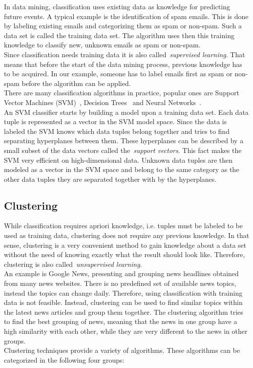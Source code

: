 In data mining, classification uses existing data as knowledge for predicting future events. A typical example is the identification of spam emails. This is done by labeling existing emails and categorizing them as spam or non-spam. Such a data set is called the training data set. The algorithm uses then this training knowledge to classify new, unknown emails as spam or non-spam.
\\
Since classification needs training data it is also called~\emph{supervised learning}. That means that before the start of the data mining process, previous knowledge has to be acquired. In our example, someone has to label emails first as spam or non-spam before the algorithm can be applied. 
\\
There are many classification algorithms in practice, popular ones are Support Vector Machines (SVM)~\parencite{svm}, Decision Trees~\parencite{descisiontree} and Neural Networks~\parencite{neuralnetwork}.
\\
An SVM classifier starts by building a model upon a training data set. Each data tuple is represented as a vector in the SVM model space. Since the data is labeled the SVM knows which data tuples belong together and tries to find separating hyperplanes between them. These hyperplanes can be described by a small subset of the data vectors called the~\emph{support vectors}. This fact makes the SVM very efficient on high-dimensional data. Unknown data tuples are then modeled as a vector in the SVM space and belong to the same category as the other data tuples they are separated together with by the hyperplanes.

\subsection{Clustering}

While classification requires apriori knowledge, i.e. tuples must be labeled to be used as training data, clustering does not require any previous knowledge. In that sense, clustering is a very convenient method to gain knowledge about a data set without the need of knowing exactly what the result should look like. Therefore, clustering is also called~\emph{unsupervised learning}.
\\
An example is Google News, presenting and grouping news headlines obtained from many news websites. There is no predefined set of available news topics, instead the topics can change daily. Therefore, using classification with training data is not feasible. Instead, clustering can be used to find similar topics within the latest news articles and group them together. The clustering algorithm tries to find the best grouping of news, meaning that the news in one group have a high similarity with each other, while they are very different to the news in other groups. 
\\
Clustering techniques provide a variety of algorithms. These algorithms can be categorized in the following four groups:

